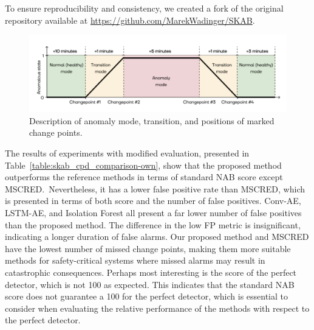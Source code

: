 To ensure reproducibility and consistency, we created a fork of the original repository available at \url{https://github.com/MarekWadinger/SKAB}.

\begin{figure}[H]
    \centering
    \includegraphics[width=\linewidth]{figures/scab-interpretation.png}
    \caption{Description of anomaly mode, transition, and positions of marked change points.}\label{fig:scab_interpretation}
\end{figure}

The results of experiments with modified evaluation, presented in Table~\ref{table:skab_cpd_comparison-own}, show that the proposed method outperforms the reference methods in terms of standard NAB score except MSCRED.~Nevertheless, it has a lower false positive rate than MSCRED, which is presented in terms of both score and the number of false positives. Conv-AE, LSTM-AE, and Isolation Forest all present a far lower number of false positives than the proposed method. The difference in the low FP metric is insignificant, indicating a longer duration of false alarms. Our proposed method and MSCRED have the lowest number of missed change points, making them more suitable methods for safety-critical systems where missed alarms may result in catastrophic consequences. Perhaps most interesting is the score of the perfect detector, which is not 100 as expected. This indicates that the standard NAB score does not guarantee a 100 for the perfect detector, which is essential to consider when evaluating the relative performance of the methods with respect to the perfect detector.

